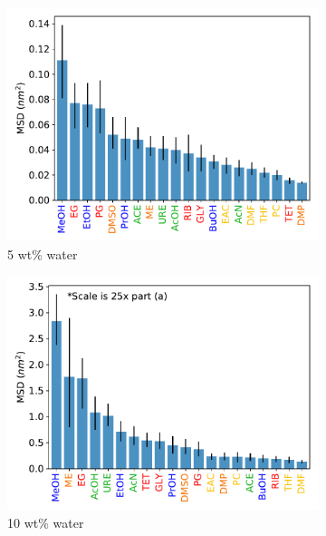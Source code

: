 \documentclass[journal=jpcbfk,manuscript=article]{achemso}
\begin{document}
  \begin{figure}[!htb]
  \centering
  \begin{subfigure}{0.45\textwidth}
  \includegraphics[width=\textwidth]{all_5wt_tamsds.pdf}
  \caption{5 wt\% water}\label{fig:all_msds_5wt}
  \end{subfigure}
  \begin{subfigure}{0.45\textwidth}
  \includegraphics[width=\textwidth]{all_10wt_tamsds.pdf}
  \caption{10 wt\% water}\label{fig:all_msds_10wt}
  \end{subfigure}
  \begin{subfigure}{0.45\textwidth}

\end{subfigure}
\end{figure}
\end{document}
